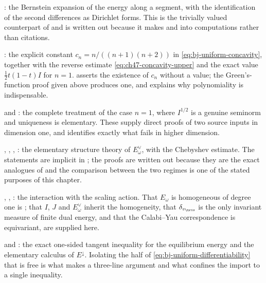 : the Bernstein expansion of the energy
along a segment, with the identification of the second differences as
Dirichlet forms.  This is the trivially valued counterpart of
 and is written out because it makes
 and
 into computations rather than citations.

: the explicit constant
$c_n=n/((n+1)(n+2))$ in \eqref{eq:bj-uniform-concavity}, together with
the reverse estimate \eqref{eq:ch47-concavity-upper} and the exact value
$\tfrac12t(1-t)I$ for $n=1$.  \cite[Theorem~7.28]{BJ22} asserts the
existence of $c_n$ without a value; the Green's-function proof given
above produces one, and  explains why
polynomiality is indispensable.

 and : the
complete treatment of the case $n=1$, where $I^{1/2}$ is a genuine
seminorm and uniqueness is elementary.  These supply direct proofs of two source inputs in dimension one, and
 identifies exactly what fails in higher
dimension.

, ,
,
: the elementary structure theory of
$E^\vee_\omega$, with the Chebyshev estimate.  The statements are
implicit in \cite[\S9]{BJ22}; the proofs are written out because they are
the exact analogues of
and the comparison between the two regimes is one of the stated purposes of
this chapter.

, ,
: the interaction with the scaling action.  That
$E_\omega$ is homogeneous of degree one is
; that $I$, $J$ and
$E^\vee_\omega$ inherit the homogeneity, that
$\delta_{v_{\triv}}$ is the only invariant measure of finite dual
energy, and that the Calabi--Yau correspondence is equivariant, are
supplied here.

 and
: the exact one-sided tangent inequality for
the equilibrium energy and the elementary calculus of $E^\downarrow$.
Isolating the half of \eqref{eq:bj-uniform-differentiability} that is free
is what makes  a three-line
argument and what confines the import to a single inequality.

